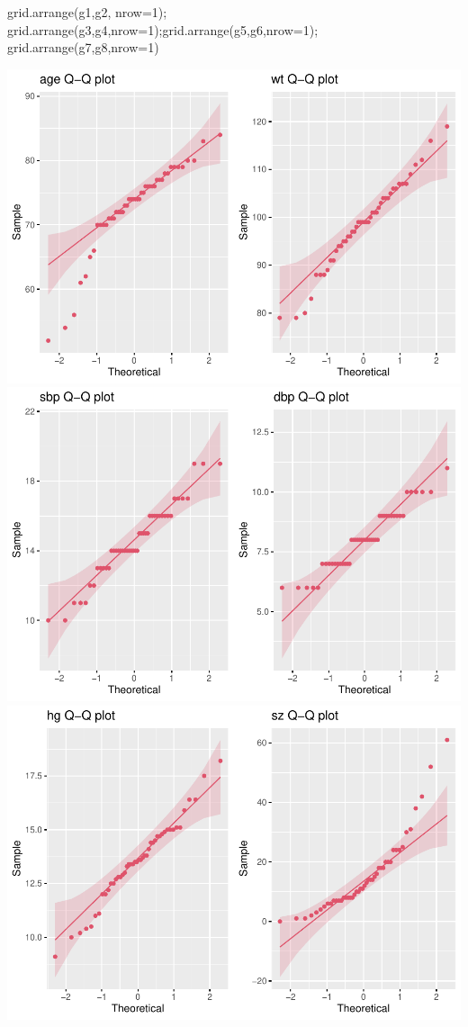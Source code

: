 \documentclass[
]{article}
\newenvironment{Shaded}{\begin{snugshade}}{\end{snugshade}}
\newcommand{\AttributeTok}[1]{\textcolor[rgb]{0.77,0.63,0.00}{#1}}
\newcommand{\DecValTok}[1]{\textcolor[rgb]{0.00,0.00,0.81}{#1}}
\newcommand{\FunctionTok}[1]{\textcolor[rgb]{0.00,0.00,0.00}{#1}}
\newcommand{\NormalTok}[1]{#1}
\begin{document}
\begin{Shaded}
\begin{Highlighting}[]
\FunctionTok{grid.arrange}\NormalTok{(g1,g2, }\AttributeTok{nrow=}\DecValTok{1}\NormalTok{); }\FunctionTok{grid.arrange}\NormalTok{(g3,g4,}\AttributeTok{nrow=}\DecValTok{1}\NormalTok{);}\FunctionTok{grid.arrange}\NormalTok{(g5,g6,}\AttributeTok{nrow=}\DecValTok{1}\NormalTok{); }\FunctionTok{grid.arrange}\NormalTok{(g7,g8,}\AttributeTok{nrow=}\DecValTok{1}\NormalTok{)}
\end{Highlighting}
\end{Shaded}

\includegraphics{clustering_files/figure-latex/unnamed-chunk-27-1.pdf}
\includegraphics{clustering_files/figure-latex/unnamed-chunk-27-2.pdf}
\includegraphics{clustering_files/figure-latex/unnamed-chunk-27-3.pdf}
\end{document}
